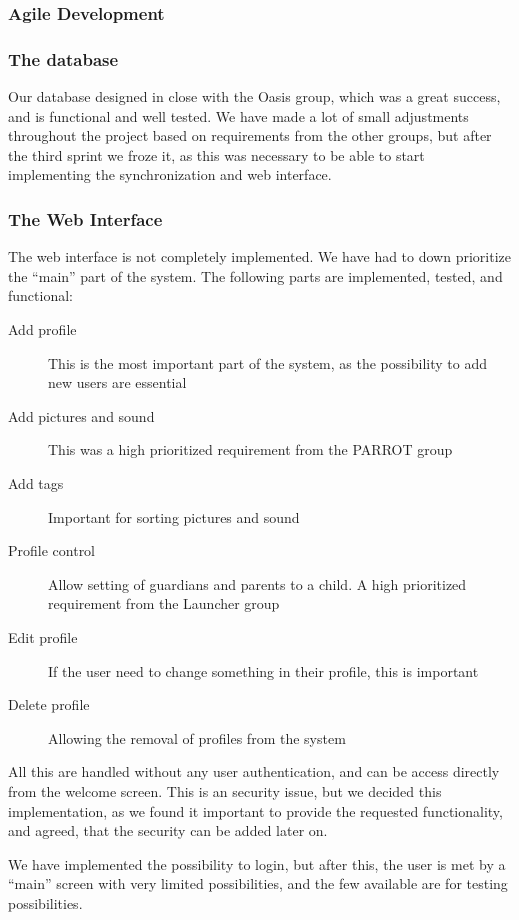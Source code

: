 \subsubsection*{Agile Development}

\subsubsection*{The database}
Our database designed in close with the Oasis group, which was a great success, and is functional and well tested. We have made a lot of small adjustments throughout the project based on requirements from the other groups, but after the third sprint we froze it, as this was necessary to be able to start implementing the synchronization and web interface.

\subsubsection*{The Web Interface}
The web interface is not completely implemented. We have had to down prioritize the ``main'' part of the system. The following parts are implemented, tested, and functional:
\begin{description}
	\item[Add profile] This is the most important part of the system, as the possibility to add new users are essential
	\item[Add pictures and sound] This was a high prioritized requirement from the PARROT group
	\item[Add tags] Important for sorting pictures and sound
	\item[Profile control] Allow setting of guardians and parents to a child. A high prioritized requirement from the Launcher group
	\item[Edit profile] If the user need to change something in their profile, this is important
	\item[Delete profile] Allowing the removal of profiles from the system
\end{description}
All this are handled without any user authentication, and can be access directly from the welcome screen. This is an security issue, but we decided this implementation, as we found it important to provide the requested functionality, and agreed, that the security can be added later on.

We have implemented the possibility to login, but after this, the user is met by a ``main'' screen with very limited possibilities, and the few available are for testing possibilities.

